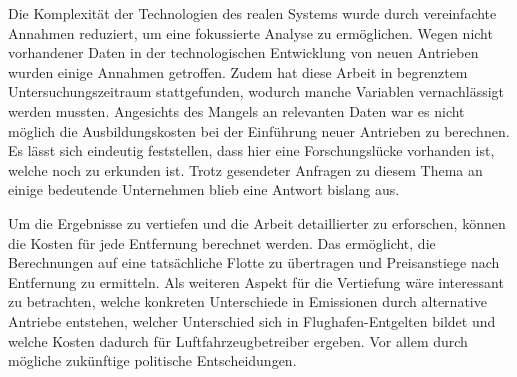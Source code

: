 Die Komplexität der Technologien des realen Systems wurde durch vereinfachte Annahmen reduziert, 
um eine fokussierte Analyse zu ermöglichen. 
Wegen nicht vorhandener Daten in der technologischen Entwicklung von neuen Antrieben wurden einige Annahmen getroffen.
Zudem hat diese Arbeit in begrenztem Untersuchungszeitraum stattgefunden, 
wodurch manche Variablen vernachlässigt werden mussten.
%
Angesichts des Mangels an relevanten Daten war es nicht möglich die Ausbildungskosten bei der Einführung neuer Antrieben zu berechnen.
Es lässt sich eindeutig feststellen, dass hier eine Forschungslücke vorhanden ist, welche noch zu erkunden ist.
Trotz gesendeter Anfragen zu diesem Thema an einige bedeutende Unternehmen blieb eine Antwort bislang aus.
%

Um die Ergebnisse zu vertiefen und die Arbeit detaillierter zu erforschen, können die Kosten für jede Entfernung berechnet werden.
Das ermöglicht, die Berechnungen auf eine tatsächliche Flotte zu übertragen und Preisanstiege nach Entfernung zu ermitteln.
Als weiteren Aspekt für die Vertiefung wäre interessant zu betrachten, welche konkreten Unterschiede in Emissionen durch 
alternative Antriebe entstehen, welcher Unterschied sich in Flughafen-Entgelten bildet und welche Kosten dadurch
für Luftfahrzeugbetreiber ergeben. Vor allem durch mögliche zukünftige politische Entscheidungen.


